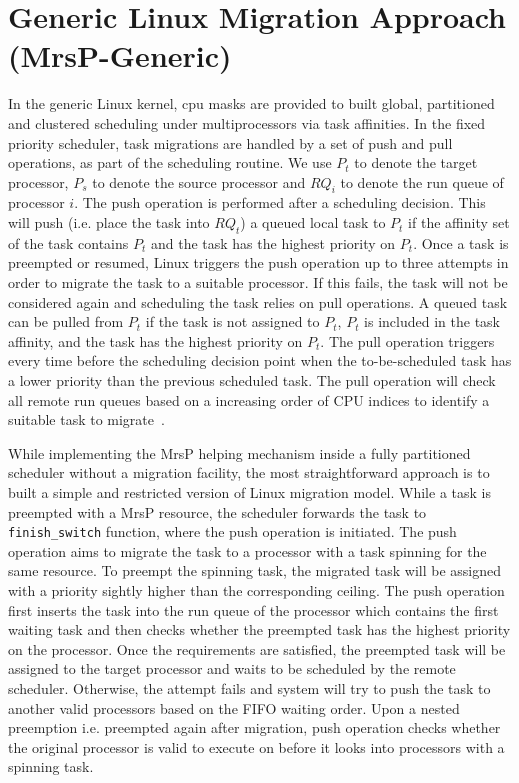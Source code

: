 \documentclass{report}
\begin{document}
\section{Generic Linux Migration Approach (MrsP-Generic)}
In the generic Linux kernel, cpu masks are provided to built global, partitioned and clustered scheduling under multiprocessors via task affinities. In the fixed priority scheduler, task migrations are handled by a set of push and pull operations, as part of the scheduling routine. We use $P_{t}$ to denote the target processor, $P_{s}$ to denote the source processor and $RQ_{i}$ to denote the run queue of processor $i$. The push operation is performed after a scheduling decision. This will push (i.e. place the task into $RQ_{t}$) a queued local task to $P_{t}$ if the affinity set of the task contains $P_{t}$ and the task has the highest priority on $P_{t}$. Once a task is preempted or resumed, Linux triggers the push operation up to three attempts in order to migrate the task to a suitable processor. If this fails, the task will not be considered again and scheduling the task relies on pull operations. A queued task can be pulled from $P_{t}$ if the task is not assigned to $P_{t}$, $P_{t}$ is included in the task affinity, and the task has the highest priority on $P_{t}$. The pull operation triggers every time before the scheduling decision point when the to-be-scheduled task has a lower priority than the previous scheduled task. The pull operation will check all remote run queues based on a increasing order of CPU indices to identify a suitable task to migrate~\cite{bovet2005understanding}.

While implementing the MrsP helping mechanism inside a fully partitioned scheduler without a migration facility, the most straightforward approach is to built a simple and restricted version of Linux migration model. While a task is preempted with a MrsP resource, the scheduler forwards the task to \texttt{finish\_switch} function, where the push operation is initiated. The push operation aims to migrate the task to a processor with a task spinning for the same resource. To preempt the spinning task, the migrated task will be assigned with a priority sightly higher than the corresponding ceiling. The push operation first inserts the task into the run queue of the processor which contains the first waiting task and then checks whether the preempted task has the highest priority on the processor. Once the requirements are satisfied, the preempted task will be assigned to the target processor and waits to be scheduled by the remote scheduler. Otherwise, the attempt fails and system will try to push the task to another valid processors based on the FIFO waiting order. Upon a nested preemption i.e. preempted again after migration, push operation checks whether the original processor is valid to execute on before it looks into processors with a spinning task.
\end{document}
